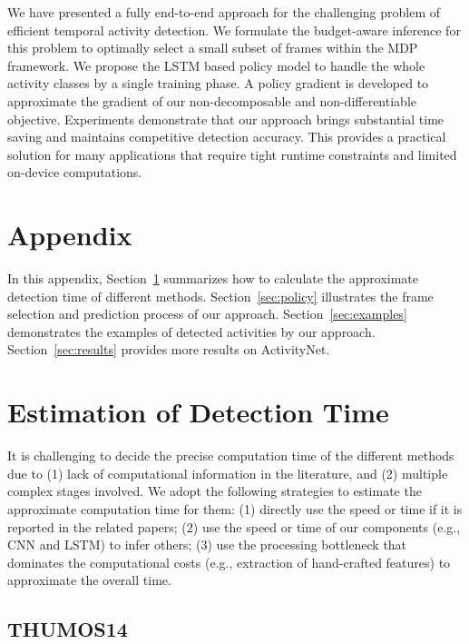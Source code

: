 \documentclass{bmvc2k}
\begin{document}
We have presented a fully end-to-end approach for the challenging problem of efficient temporal activity detection. We formulate the budget-aware inference for this problem to optimally select a small subset of frames within the MDP framework. We propose the LSTM based policy model to handle the whole activity classes by a single training phase. A policy gradient is developed to approximate the gradient of our non-decomposable and non-differentiable objective. Experiments demonstrate that our approach brings substantial time saving and maintains competitive detection accuracy. This provides a practical solution for many applications that require tight runtime constraints and limited on-device computations.



\section*{Appendix}

\setcounter{section}{0}
\renewcommand\thesection{\Alph{section}}

In this appendix, Section~\ref{sec:time} summarizes how to calculate the approximate detection time of different methods. Section~\ref{sec:policy} illustrates the frame selection and prediction process of our approach. Section~\ref{sec:examples} demonstrates the examples of detected activities by our approach. Section~\ref{sec:results} provides more results on ActivityNet. 

\section{Estimation of Detection Time}
\label{sec:time}

It is challenging to decide the precise computation time of the different methods due to (1) lack of computational information in the literature, and (2) multiple complex stages involved. We adopt the following strategies to estimate the approximate computation time for them: (1) directly use the speed or time if it is reported in the related papers; (2) use the speed or time of our components (e.g., CNN and LSTM) to infer others; (3) use the processing bottleneck that dominates the computational costs (e.g., extraction of hand-crafted features) to approximate the overall time.

\subsection{THUMOS14}
\end{document}
